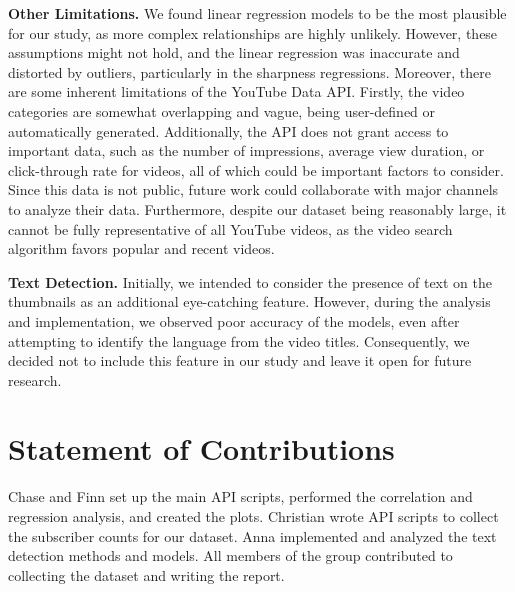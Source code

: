 \documentclass{article}
\begin{document}
\textbf{Other Limitations.} We found linear regression models to be the most plausible for our study, as more complex relationships are highly unlikely. However, these assumptions might not hold, and the linear regression was inaccurate and distorted by outliers, particularly in the sharpness regressions. Moreover, there are some inherent limitations of the YouTube Data API. Firstly, the video categories are somewhat overlapping and vague, being user-defined or automatically generated. Additionally, the API does not grant access to important data, such as the number of impressions, average view duration, or click-through rate for videos, all of which could be important factors to consider. Since this data is not public, future work could collaborate with major channels to analyze their data. Furthermore, despite our dataset being reasonably large, it cannot be fully representative of all YouTube videos, as the video search algorithm favors popular and recent videos.

\textbf{Text Detection.} Initially, we intended to consider the presence of text on the thumbnails as an additional eye-catching feature. However, during the analysis and implementation, we observed poor accuracy of the models, even after attempting to identify the language from the video titles. Consequently, we decided not to include this feature in our study and leave it open for future research.

\section{Statement of Contributions}
Chase and Finn set up the main API scripts, performed the correlation and regression analysis, and created the plots. Christian wrote API scripts to collect the subscriber counts for our dataset. Anna implemented and analyzed the text detection methods and models. All members of the group contributed to collecting the dataset and writing the report.

\vfill
\pagebreak


\end{document}
